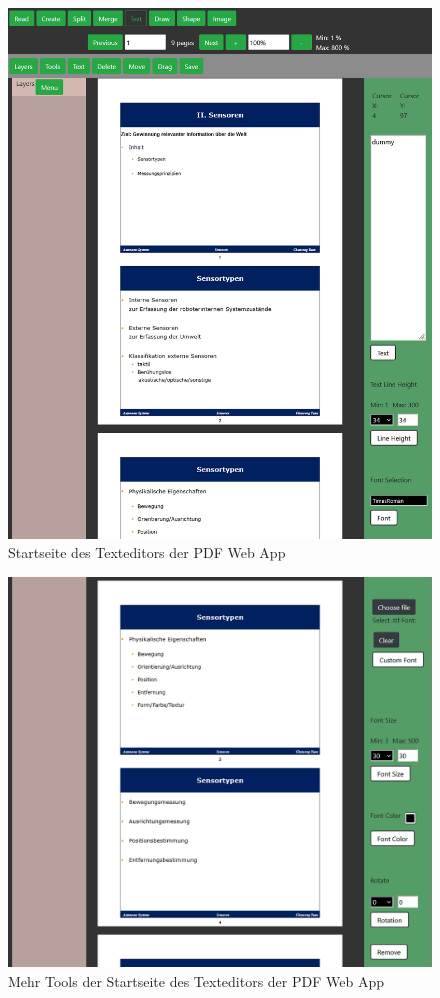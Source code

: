 \begin{figure}[!htbp]
	\centering
	\includegraphics[width=1\textwidth]{"images/texteditor.png"}
	\caption{Startseite des Texteditors der PDF Web App}
	\label{fig:texteditor}
\end{figure}

\begin{figure}[!htbp]
	\centering
	\includegraphics[width=1\textwidth]{"images/texteditor2.png"}
	\caption{Mehr Tools der Startseite des Texteditors der PDF Web App}
	\label{fig:texteditor2}
\end{figure}

